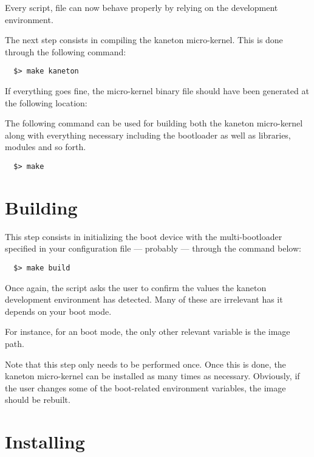 Every script,  file \etc{} can now behave properly by relying on
the development environment.

The next step consists in compiling the kaneton micro-kernel. This is done
through the following command:

\begin{verbatim}
  $> make kaneton
\end{verbatim}

If everything goes fine, the micro-kernel binary file should have been
generated at the following location:

\begin{center}
\end{center}

The following command can be used for building both the kaneton micro-kernel
along with everything necessary including the bootloader as well as libraries,
modules and so forth.

\begin{verbatim}
  $> make
\end{verbatim}

%
%

\section{Building}

This step consists in initializing the boot device with the multi-bootloader
specified in your configuration file --- probably  --- through the
command below:

\begin{verbatim}
  $> make build
\end{verbatim}

Once again, the script asks the user to confirm the values the kaneton
development environment has detected. Many of these are irrelevant has
it depends on your boot mode.

For instance, for an  boot mode, the only other relevant variable
is the image path.

Note that this step only needs to be performed once. Once this is done, the
kaneton micro-kernel can be installed as many times as necessary. Obviously,
if the user changes some of the boot-related environment variables, the image
should be rebuilt.

%
%

\section{Installing}

